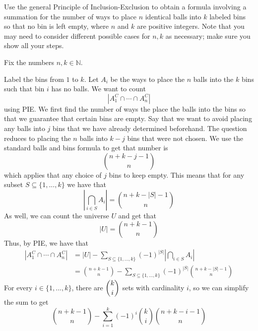 \documentclass{eh-homework}
\begin{document}
    \begin{question}{1}
        Use the general Principle of Inclusion-Exclusion to obtain a formula involving a summation for the number of ways to place $n$ identical balls into $k$ labeled bins so that no bin is left empty, where $n$ and $k$ are positive integers. Note that you may need to consider different possible cases for $n, k$ as necessary; make sure you show all your steps.

        \tcblower

        Fix the numbers \(n,k \in \mathbb{N}\).

        Label the bins from \(1\) to \(k\). Let \(A_i\) be the ways to place the \(n\) balls into the \(k\) bins such that bin \(i\) has no balls. We want to count
        \[
            \left|A_1^C \cap \cdots \cap A_n^C\right|
        \]
        using PIE. We first find the number of ways the place the balls into the bins so that we guarantee that certain bins are empty. Say that we want to avoid placing any balls into \(j\) bins that we have already determined beforehand. The question reduces to placing the \(n\) balls into \(k-j\) bins that were not chosen. We use the standard balls and bins formula to get that number is
        \[
            \binom{n + k - j - 1}{n}
        \]
        which applies that any choice of \(j\) bins to keep empty. This means that for any subset \(S \subseteq \{ 1,..., k \}\) we have that
        \[
            \left\vert \bigcap_{i\in S} A_i \right\vert = \binom{n + k - |S| - 1}{n}
        \]
        As well, we can count the universe \(U\) and get that
        \[
            |U| = \binom{n + k - 1}{n}
        \]
        Thus, by PIE, we have that
        \begin{align*}
            \left|A_1^C \cap \cdots \cap A_n^C\right| &= |U| - \sum_{S \subseteq \{ 1, ..., k \}} (-1)^{|S|} \left\vert \bigcap_{i \in S} A_i \right\vert \\
            &= \binom{n + k - 1}{n} - \sum_{S \subseteq \{ 1, ..., k \}} (-1)^{|S|} \binom{n + k - |S| - 1}{n}
        \end{align*}
        For every \(i \in \{ 1, ..., k \}\), there are \(\dbinom{k}{i}\) sets with cardinality \(i\), so we can simplify the sum to get
        \[
            \binom{n+k-1}{n} - \sum_{i=1}^{k} (-1)^i \binom{k}{i} \binom{n + k - i - 1}{n}
        \]
    \end{question}
\end{document}
